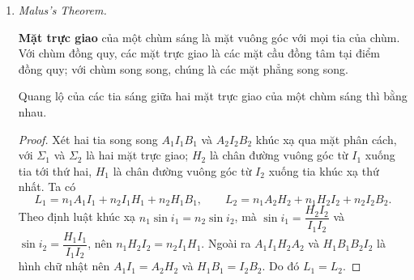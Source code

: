 \begin{enumerate}
\item \textit{Malus's Theorem.}\\
\begin{definition}
\textbf{Mặt trực giao} của một chùm sáng là mặt vuông góc với mọi tia của chùm. Với chùm đồng quy, các mặt trực giao là các mặt cầu đồng tâm tại điểm đồng quy; với chùm song song, chúng là các mặt phẳng song song.
\end{definition}
\begin{theorem}[Malus]
Quang lộ của các tia sáng giữa hai mặt trực giao của một chùm sáng thì bằng nhau.
\end{theorem}
\begin{proof}
Xét hai tia song song $A_1I_1B_1$ và $A_2I_2B_2$ khúc xạ qua mặt phân cách, với $\Sigma_1$ và $\Sigma_2$ là hai mặt trực giao; $H_2$ là chân đường vuông góc từ $I_1$ xuống tia tới thứ hai, $H_1$ là chân đường vuông góc từ $I_2$ xuống tia khúc xạ thứ nhất.
Ta có
\[
L_1 = n_1 A_1I_1 + n_2 I_1H_1 + n_2 H_1B_1,
\qquad
L_2 = n_1 A_2H_2 + n_1 H_2I_2 + n_2 I_2B_2.
\]
Theo định luật khúc xạ $n_1\sin i_1 = n_2\sin i_2$, mà $\sin i_1 = \dfrac{H_2I_2}{I_1I_2}$ và $\sin i_2 = \dfrac{H_1I_1}{I_1I_2}$, nên $n_1 H_2I_2 = n_2 I_1H_1$. Ngoài ra $A_1I_1H_2A_2$ và $H_1B_1B_2I_2$ là hình chữ nhật nên $A_1I_1 = A_2H_2$ và $H_1B_1 = I_2B_2$. Do đó $L_1 = L_2$.
\end{proof}
\end{enumerate}


